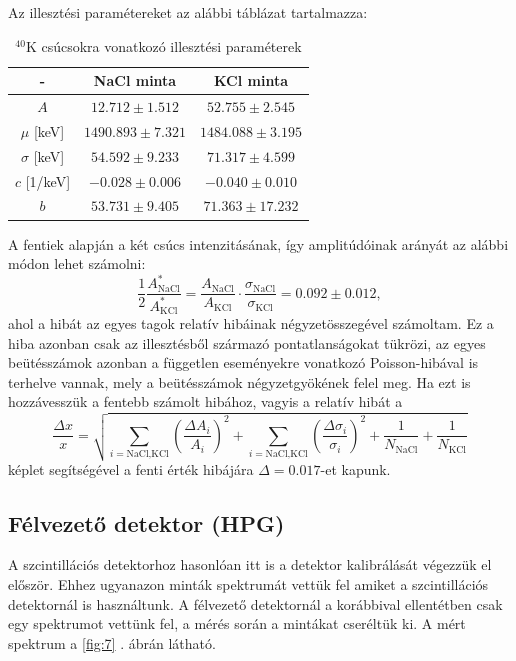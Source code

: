 \documentclass[12pt,a4paper]{article}
\begin{document}
Az illesztési paramétereket az alábbi táblázat tartalmazza:
\begin{table}[!h]
\begin{center}
\begin{tabular}{|c|c||c|}
\hline
- & NaCl minta & KCl minta \\
\hline
$A$ & $12.712 \pm 1.512$ & $52.755 \pm 2.545$ \\
\hline
$\mu$ [keV] & $1490.893 \pm 7.321$ & $1484.088 \pm 3.195$ \\ 
\hline
$\sigma$ [keV] & $54.592 \pm 9.233$ & $71.317 \pm 4.599$ \\
\hline
$c$ [1/keV] & $-0.028 \pm 0.006$ & $-0.040 \pm 0.010$ \\
\hline
$b$ & $53.731 \pm 9.405$ & $71.363 \pm 17.232$ \\
\hline
\end{tabular}
\caption{$^{40}$K csúcsokra vonatkozó illesztési paraméterek}
\end{center}
\end{table}
\newline
A fentiek alapján a két csúcs intenzitásának, így amplitúdóinak arányát az alábbi módon lehet számolni:
$$\frac{1}{2}\frac{A^{*}_{\textrm{NaCl}}}{A^{*}_{\textrm{KCl}}}=
\frac{A_{\textrm{NaCl}}}{A_{\textrm{KCl}}}\cdot  \frac{\sigma_{\textrm{NaCl}}}{\sigma_{\textrm{KCl}}} = 0.092 \pm 0.012 ,$$
ahol a hibát az egyes tagok relatív hibáinak négyzetösszegével számoltam. Ez a hiba azonban csak az illesztésből származó pontatlanságokat tükrözi, az egyes beütésszámok azonban a független eseményekre vonatkozó Poisson-hibával is terhelve vannak, mely a beütésszámok négyzetgyökének felel meg. Ha ezt is hozzávesszük a fentebb számolt hibához, vagyis a relatív hibát a 
$$\frac{\Delta x}{x} = \sqrt{\sum_{i=\textrm{NaCl,KCl}} \left(\frac{\Delta A_i}{A_i}\right)^2 + \sum_{i=\textrm{NaCl,KCl}} \left(\frac{\Delta \sigma_i}{\sigma_i}\right)^2 + \frac{1}{N_{\textrm{NaCl}}} + \frac{1}{N_{\textrm{KCl}}}} $$
képlet segítségével a fenti érték hibájára $\Delta = 0.017$-et kapunk.
\newpage
\subsection{Félvezető detektor (HPG)}
\hspace*{10pt} A szcintillációs detektorhoz hasonlóan itt is a detektor kalibrálását végezzük el először. Ehhez ugyanazon minták spektrumát vettük fel amiket a szcintillációs detektornál is használtunk. A félvezető detektornál a korábbival ellentétben csak egy spektrumot vettünk fel, a mérés során a mintákat cseréltük ki. A mért spektrum a \ref{fig:7} . ábrán látható.
\end{document}

